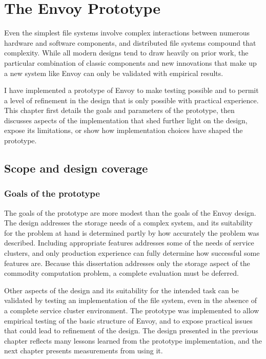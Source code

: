 \chapter{The Envoy Prototype}\label{cha:implementation}

Even the simplest file systems involve complex interactions between numerous hardware and software components, and distributed file systems compound that complexity. While all modern designs tend to draw heavily on prior work, the particular combination of classic components and new innovations that make up a new system like Envoy can only be validated with empirical results.

I have implemented a prototype of Envoy to make testing possible and to permit a level of refinement in the design that is only possible with practical experience. This chapter first details the goals and parameters of the prototype, then discusses aspects of the implementation that shed further light on the design, expose its limitations, or show how implementation choices have shaped the prototype.

\section{Scope and design coverage}

\subsection{Goals of the prototype}

The goals of the prototype are more modest than the goals of the Envoy design. The design addresses the storage needs of a complex system, and its suitability for the problem at hand is determined partly by how accurately the problem was described. Including appropriate features addresses some of the needs of service clusters, and only production experience can fully determine how successful some features are. Because this dissertation addresses only the storage aspect of the commodity computation problem, a complete evaluation must be deferred.

Other aspects of the design and its suitability for the intended task can be validated by testing an implementation of the file system, even in the absence of a complete service cluster environment. The prototype was implemented to allow empirical testing of the basic structure of Envoy, and to expose practical issues that could lead to refinement of the design. The design presented in the previous chapter reflects many lessons learned from the prototype implementation, and the next chapter presents measurements from using it.

